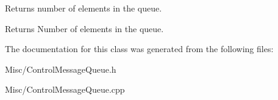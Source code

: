Returns number of elements in the queue. 

\begin{DoxyReturn}{Returns}
Number of elements in the queue. 
\end{DoxyReturn}


The documentation for this class was generated from the following files\+:\begin{DoxyCompactItemize}
\item 
Misc/Control\+Message\+Queue.\+h\item 
Misc/Control\+Message\+Queue.\+cpp\end{DoxyCompactItemize}
